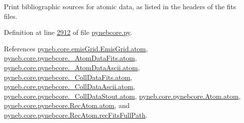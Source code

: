 \begin{DoxyVerb}Print bibliographic sources for atomic data, as listed in the headers of the fits files.\end{DoxyVerb}
 

Definition at line \hyperlink{pynebcore_8py_source_l02912}{2912} of file \hyperlink{pynebcore_8py_source}{pynebcore.\-py}.



References \hyperlink{emis_grid_8py_source_l00051}{pyneb.\-core.\-emis\-Grid.\-Emis\-Grid.\-atom}, \hyperlink{pynebcore_8py_source_l00089}{pyneb.\-core.\-pynebcore.\-\_\-\-Atom\-Data\-Fits.\-atom}, \hyperlink{pynebcore_8py_source_l00310}{pyneb.\-core.\-pynebcore.\-\_\-\-Atom\-Data\-Ascii.\-atom}, \hyperlink{pynebcore_8py_source_l00576}{pyneb.\-core.\-pynebcore.\-\_\-\-Coll\-Data\-Fits.\-atom}, \hyperlink{pynebcore_8py_source_l00926}{pyneb.\-core.\-pynebcore.\-\_\-\-Coll\-Data\-Ascii.\-atom}, \hyperlink{pynebcore_8py_source_l01162}{pyneb.\-core.\-pynebcore.\-\_\-\-Coll\-Data\-Stout.\-atom}, \hyperlink{pynebcore_8py_source_l01218}{pyneb.\-core.\-pynebcore.\-Atom.\-atom}, \hyperlink{pynebcore_8py_source_l02635}{pyneb.\-core.\-pynebcore.\-Rec\-Atom.\-atom}, and \hyperlink{pynebcore_8py_source_l02726}{pyneb.\-core.\-pynebcore.\-Rec\-Atom.\-rec\-Fits\-Full\-Path}.


